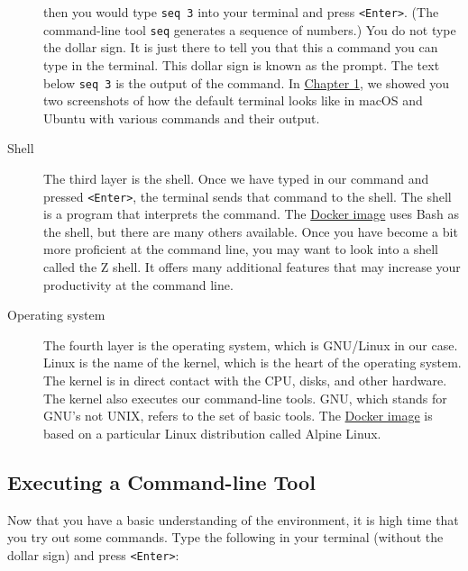 \documentclass[
]{book}
\newenvironment{Shaded}{\begin{snugshade}}{\end{snugshade}}
\newcommand{\BuiltInTok}[1]{#1}
\newcommand{\ExtensionTok}[1]{#1}
\newcommand{\NormalTok}[1]{#1}
\theoremstyle{definition}
\theoremstyle{definition}
\theoremstyle{definition}
\theoremstyle{remark}
\begin{document}
\begin{description}
then you would type \texttt{seq\ 3} into your terminal and press \texttt{\textless{}Enter\textgreater{}}. (The command-line tool \texttt{seq} \citep{seq} generates a sequence of numbers.) You do not type the dollar sign. It is just there to tell you that this a command you can type in the terminal. This dollar sign is known as the prompt. The text below \texttt{seq\ 3} is the output of the command. In \protect\hyperlink{chapter-1-introduction}{Chapter 1}, we showed you two screenshots of how the default terminal looks like in macOS and Ubuntu with various commands and their output.
\item[Shell]
The third layer is the shell. Once we have typed in our command and pressed \texttt{\textless{}Enter\textgreater{}}, the terminal sends that command to the shell. The shell is a program that interprets the command. The \protect\hyperlink{docker-image}{Docker image} uses Bash as the shell, but there are many others available. Once you have become a bit more proficient at the command line, you may want to look into a shell called the Z shell. It offers many additional features that may increase your productivity at the command line.
\item[Operating system]
The fourth layer is the operating system, which is GNU/Linux in our case. Linux is the name of the kernel, which is the heart of the operating system. The kernel is in direct contact with the CPU, disks, and other hardware. The kernel also executes our command-line tools. GNU, which stands for GNU's not UNIX, refers to the set of basic tools. The \protect\hyperlink{docker-image}{Docker image} is based on a particular Linux distribution called Alpine Linux.
\end{description}

\hypertarget{executing-a-command-line-tool}{%
\subsection{Executing a Command-line Tool}\label{executing-a-command-line-tool}}

Now that you have a basic understanding of the environment, it is high time that you try out some commands. Type the following in your terminal (without the dollar sign) and press \texttt{\textless{}Enter\textgreater{}}:

\begin{Shaded}
\end{Shaded}
\end{document}
